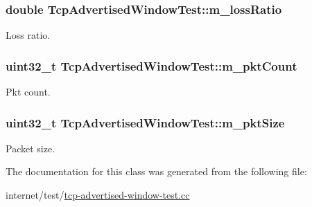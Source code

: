 \subsubsection[{\texorpdfstring{m\+\_\+loss\+Ratio}{m_lossRatio}}]{\setlength{\rightskip}{0pt plus 5cm}double Tcp\+Advertised\+Window\+Test\+::m\+\_\+loss\+Ratio\hspace{0.3cm}{\ttfamily [private]}}\hypertarget{classTcpAdvertisedWindowTest_a8c9c999fd976892f003de76c56e7fff1}{}\label{classTcpAdvertisedWindowTest_a8c9c999fd976892f003de76c56e7fff1}


Loss ratio. 

\subsubsection[{\texorpdfstring{m\+\_\+pkt\+Count}{m_pktCount}}]{\setlength{\rightskip}{0pt plus 5cm}uint32\+\_\+t Tcp\+Advertised\+Window\+Test\+::m\+\_\+pkt\+Count\hspace{0.3cm}{\ttfamily [private]}}\hypertarget{classTcpAdvertisedWindowTest_ab2bb9b1d37975c7a054af56d40f5d033}{}\label{classTcpAdvertisedWindowTest_ab2bb9b1d37975c7a054af56d40f5d033}


Pkt count. 

\subsubsection[{\texorpdfstring{m\+\_\+pkt\+Size}{m_pktSize}}]{\setlength{\rightskip}{0pt plus 5cm}uint32\+\_\+t Tcp\+Advertised\+Window\+Test\+::m\+\_\+pkt\+Size\hspace{0.3cm}{\ttfamily [private]}}\hypertarget{classTcpAdvertisedWindowTest_a15543ae7eb5ff02ef55df25327f489d4}{}\label{classTcpAdvertisedWindowTest_a15543ae7eb5ff02ef55df25327f489d4}


Packet size. 



The documentation for this class was generated from the following file\+:\begin{DoxyCompactItemize}
\item 
internet/test/\hyperlink{tcp-advertised-window-test_8cc}{tcp-\/advertised-\/window-\/test.\+cc}\end{DoxyCompactItemize}
